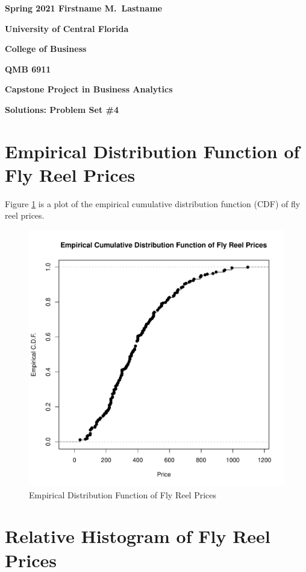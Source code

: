 \documentclass[11pt]{book}
\begin{document}

\pagestyle{empty}
{\noindent\bf Spring 2021 \hfill Firstname M.~Lastname}
\vskip 16pt
\centerline{\bf University of Central Florida}
\centerline{\bf College of Business}
\vskip 16pt
\centerline{\bf QMB 6911}
\centerline{\bf Capstone Project in Business Analytics}
\vskip 10pt
\centerline{\bf Solutions:  Problem Set \#4}
\vskip 32pt
\noindent



\section*{Empirical Distribution Function of Fly Reel Prices}

Figure \ref{fig:ecdf_prices} is 
a plot of the empirical cumulative distribution function (CDF) of fly reel prices. 


\begin{figure}[h!]
  \centering
  \includegraphics[scale = 0.5, keepaspectratio=true]{../Figures/ecdf_prices}
  \caption{Empirical Distribution Function of Fly Reel Prices} \label{fig:ecdf_prices}
\end{figure}


\section*{Relative Histogram of Fly Reel Prices}
\end{document}
